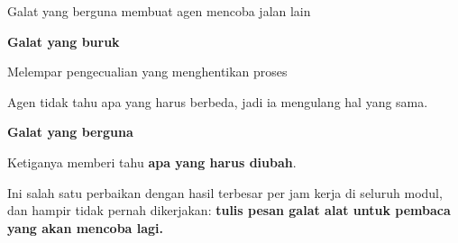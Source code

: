 \documentclass[aspectratio=169,11pt,t]{beamer}
\begin{document}
\begin{frame}[shrink=25]{Galat yang berguna membuat agen mencoba jalan lain}
\begin{minipage}[t]{0.485\textwidth}
{\fontsize{9.4}{12.6}\selectfont\color{fg2}\textbf{Galat yang buruk}\par}\vskip 4pt
\begin{ibullets}
\item {}
\item {}
\item Melempar pengecualian yang menghentikan proses
\end{ibullets}
{\fontsize{9.4}{12.6}\selectfont\color{fg2}Agen tidak tahu apa yang harus berbeda, jadi ia mengulang hal yang sama.\par}\vskip 4pt

\end{minipage}%
\hfill
\begin{minipage}[t]{0.485\textwidth}
{\fontsize{9.4}{12.6}\selectfont\color{fg2}\textbf{Galat yang berguna}\par}\vskip 4pt
\begin{ibullets}
\item {}
\item {}
\item {}
\end{ibullets}
{\fontsize{9.4}{12.6}\selectfont\color{fg2}Ketiganya memberi tahu \textbf{apa yang harus diubah}.\par}\vskip 4pt

\end{minipage}%
\begin{iband}[signal]
Ini salah satu perbaikan dengan hasil terbesar per jam kerja di seluruh modul, dan hampir tidak pernah dikerjakan: \textbf{tulis pesan galat alat untuk pembaca yang akan mencoba lagi.}
\end{iband}
\end{frame}
\end{document}
